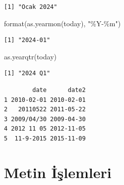 \documentclass[
  letterpaper,
  DIV=11,
  numbers=noendperiod]{scrreprt}
\newenvironment{Shaded}{\begin{snugshade}}{\end{snugshade}}
\newcommand{\AttributeTok}[1]{\textcolor[rgb]{0.40,0.45,0.13}{#1}}
\newcommand{\CommentTok}[1]{\textcolor[rgb]{0.37,0.37,0.37}{#1}}
\newcommand{\FunctionTok}[1]{\textcolor[rgb]{0.28,0.35,0.67}{#1}}
\newcommand{\NormalTok}[1]{\textcolor[rgb]{0.00,0.23,0.31}{#1}}
\newcommand{\OtherTok}[1]{\textcolor[rgb]{0.00,0.23,0.31}{#1}}
\newcommand{\SpecialCharTok}[1]{\textcolor[rgb]{0.37,0.37,0.37}{#1}}
\newcommand{\StringTok}[1]{\textcolor[rgb]{0.13,0.47,0.30}{#1}}
\begin{document}
\begin{verbatim}
[1] "Ocak 2024"
\end{verbatim}

\begin{Shaded}
\begin{Highlighting}[]
\FunctionTok{format}\NormalTok{(}\FunctionTok{as.yearmon}\NormalTok{(today), }\StringTok{"\%Y{-}\%m"}\NormalTok{)}
\end{Highlighting}
\end{Shaded}

\begin{verbatim}
[1] "2024-01"
\end{verbatim}

\begin{Shaded}
\begin{Highlighting}[]
\FunctionTok{as.yearqtr}\NormalTok{(today)}
\end{Highlighting}
\end{Shaded}

\begin{verbatim}
[1] "2024 Q1"
\end{verbatim}

\begin{Shaded}
\end{Shaded}

\begin{verbatim}
        date      date2
1 2010-02-01 2010-02-01
2   20110522 2011-05-22
3 2009/04/30 2009-04-30
4 2012 11 05 2012-11-05
5  11-9-2015 2015-11-09
\end{verbatim}

\hypertarget{metin-iux15flemleri}{%
\chapter{Metin İşlemleri}\label{metin-iux15flemleri}}
\end{document}
